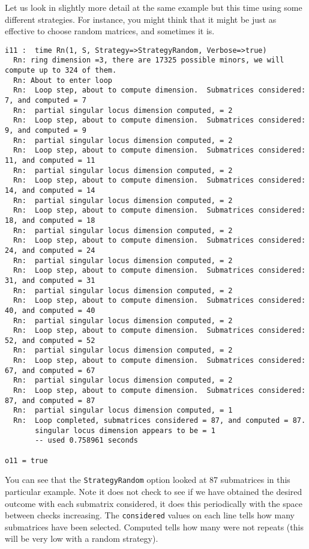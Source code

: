 \documentclass[11pt]{amsart}
\begin{document}
Let us look in slightly more detail at the same example but this time using some different strategies.  For instance, you might think that it might be just as effective to choose random matrices, and sometimes it is. 
{\small\color{blue}
\begin{verbatim}
i11 :  time Rn(1, S, Strategy=>StrategyRandom, Verbose=>true)
  Rn: ring dimension =3, there are 17325 possible minors, we will compute up to 324 of them.
  Rn: About to enter loop
  Rn:  Loop step, about to compute dimension.  Submatrices considered: 7, and computed = 7
  Rn:  partial singular locus dimension computed, = 2
  Rn:  Loop step, about to compute dimension.  Submatrices considered: 9, and computed = 9
  Rn:  partial singular locus dimension computed, = 2
  Rn:  Loop step, about to compute dimension.  Submatrices considered: 11, and computed = 11
  Rn:  partial singular locus dimension computed, = 2
  Rn:  Loop step, about to compute dimension.  Submatrices considered: 14, and computed = 14
  Rn:  partial singular locus dimension computed, = 2
  Rn:  Loop step, about to compute dimension.  Submatrices considered: 18, and computed = 18
  Rn:  partial singular locus dimension computed, = 2
  Rn:  Loop step, about to compute dimension.  Submatrices considered: 24, and computed = 24
  Rn:  partial singular locus dimension computed, = 2
  Rn:  Loop step, about to compute dimension.  Submatrices considered: 31, and computed = 31
  Rn:  partial singular locus dimension computed, = 2
  Rn:  Loop step, about to compute dimension.  Submatrices considered: 40, and computed = 40
  Rn:  partial singular locus dimension computed, = 2
  Rn:  Loop step, about to compute dimension.  Submatrices considered: 52, and computed = 52
  Rn:  partial singular locus dimension computed, = 2
  Rn:  Loop step, about to compute dimension.  Submatrices considered: 67, and computed = 67
  Rn:  partial singular locus dimension computed, = 2
  Rn:  Loop step, about to compute dimension.  Submatrices considered: 87, and computed = 87
  Rn:  partial singular locus dimension computed, = 1
  Rn:  Loop completed, submatrices considered = 87, and computed = 87.  
       singular locus dimension appears to be = 1
       -- used 0.758961 seconds
  
o11 = true
\end{verbatim}
}
You can see that the {\tt StrategyRandom} option looked at 87 submatrices in this particular example.  Note it does not check to see if we have obtained the desired outcome with each submatrix considered, it does this periodically with the space between checks increasing.  The {\tt considered} values on each line tells how many submatrices have been selected.  Computed tells how many were not repeats (this will be very low with a random strategy).
\end{document}
